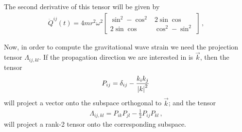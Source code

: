 \documentclass[main.tex]{subfiles}
\begin{document}
The second derivative of this tensor will be given by 
%
\begin{align}
\ddot{Q}^{ij}(t) = 4 m r^2 \omega^2 \left[\begin{array}{cc}
\sin^2 - \cos^2 & 2 \sin \cos \\ 
2 \sin \cos & \cos^2 - \sin^2
\end{array}\right]
\,,
\end{align}
%
 

Now, in order to compute the gravitational wave strain we need the projection tensor \(\Lambda_{ij, kl}\).
If the propagation direction we are interested in is \(\vec{k}\), then the tensor 
%
\begin{align}
P_{ij} = \delta_{ij} - \frac{k_i k_j}{\abs{k}^2}
\,
\end{align}
%
will project a vector onto the subspace orthogonal to \(\vec{k}\); and the tensor 
%
\begin{align}
\Lambda_{ij, kl} = P_{ik} P_{jl} - \frac{1}{2} P_{ij} P_{kl} 
\,,
\end{align}
%
will project a rank-2 tensor onto the corresponding subspace. 
\end{document}
